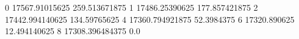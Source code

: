 0 17567.91015625 259.513671875
1 17486.25390625 177.857421875
2 17442.994140625 134.59765625
4 17360.794921875 52.3984375
6 17320.890625 12.494140625
8 17308.396484375 0.0
